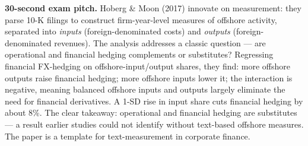 \documentclass[11pt]{article}
\begin{document}
\begin{keybox}
\textbf{30-second exam pitch.} Hoberg \& Moon (2017) innovate on measurement: they parse 10-K filings to construct firm-year-level measures of offshore activity, separated into \emph{inputs} (foreign-denominated costs) and \emph{outputs} (foreign-denominated revenues). The analysis addresses a classic question --- are operational and financial hedging complements or substitutes? Regressing financial FX-hedging on offshore-input/output shares, they find: more offshore outputs raise financial hedging; more offshore inputs lower it; the interaction is negative, meaning balanced offshore inputs and outputs largely eliminate the need for financial derivatives. A 1-SD rise in input share cuts financial hedging by about 8\%. The clear takeaway: operational and financial hedging are substitutes --- a result earlier studies could not identify without text-based offshore measures. The paper is a template for text-measurement in corporate finance.
\end{keybox}
\end{document}
